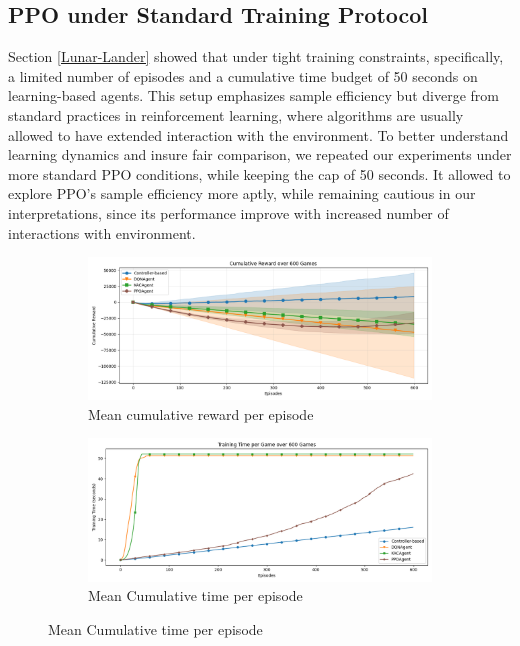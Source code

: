 \documentclass[
]{article}
\numberwithin{equation}{section}
\begin{document}
\hypertarget{SEK}{%
\subsection{PPO under Standard Training Protocol}
\label{PPO_app}
}
Section \ref{Lunar-Lander} showed that under tight training constraints, specifically, a limited number of episodes and a cumulative time budget of 50 seconds on learning-based agents. This setup emphasizes sample efficiency but diverge from standard practices in reinforcement learning, where algorithms are usually allowed to have extended interaction with the environment. To better understand learning dynamics and insure fair comparison, we repeated our experiments under more standard PPO conditions, while keeping the cap of 50 seconds. It allowed to explore PPO's sample efficiency more aptly, while remaining cautious in our interpretations, since its performance improve with increased number of interactions with environment. 


\begin{figure}[!htb]
    \centering
    \begin{subfigure}{0.48\textwidth}
        \centering
        \includegraphics[width=\textwidth]{figs/plot_rewards.png}
        \caption{Mean cumulative reward per episode}
        \label{fig:PPOLNR}
    \end{subfigure}
    \hfill
    \begin{subfigure}{0.48\textwidth}
        \centering
        \includegraphics[width=\textwidth]{figs/plot_times.png}
        \caption{Mean Cumulative time per episode}
        \label{fig:PPOLNT}
    \end{subfigure}
\end{figure}
\end{document}
